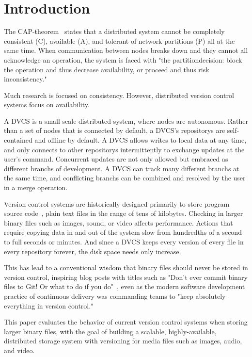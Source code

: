 \section{Introduction}

The \gls{CAP-theorem}~\cite{cap_origin} states that a distributed system cannot be completely consistent (C), available (A), and tolerant of network partitions (P) all at the same time.
When communication between nodes breaks down and they cannot all acknowledge an operation, the system is faced with "the \gls{partitiondecision}: block the operation and thus decrease availability, or proceed and thus risk inconsistency."~\cite{cap_years_later}

Much research is focused on consistency.
However, distributed version control systems focus on availability.

A \gls{DVCS} is a small-scale distributed system, where nodes are autonomous.
Rather than a set of nodes that is connected by default, a \gls{DVCS}'s \glspl{repository} are self-contained and offline by default.
A DVCS allows writes to local data at any time, and only connects to other \glspl{repository} intermittently to exchange updates at the user's command.
Concurrent updates are not only allowed but embraced as different \glspl{branch} of development.
A \gls{DVCS} can track many different \glspl{branch} at the same time, and conflicting \glspl{branch} can be combined and resolved by the user in a \gls{merge} operation.

Version control systems are historically designed primarily to store program source code~\cite{history_of_version_control}, plain text files in the range of tens of kilobytes.
Checking in larger binary files such as images, sound, or video affects performance.
Actions that require copying data in and out of the system slow from hundredths of a second to full seconds or minutes.
And since a \gls{DVCS} keeps every version of every file in every \gls{repository} forever, the disk space needs only increase.

This has lead to a conventional wisdom that binary files should never be stored in version control, inspiring blog posts with titles such as
"Don't ever commit binary files to Git! Or what to do if you do"~\cite{dont_ever_commit_binaries_to_version_control},
even as the modern software development practice of continuous delivery was commanding teams to "keep absolutely everything in version control."~\cite[p.33]{continuousdeliverybook}

This paper evaluates the behavior of current version control systems when storing larger binary files, with the goal of building a scalable, highly-available, distributed storage system with versioning for media files such as images, audio, and video.
